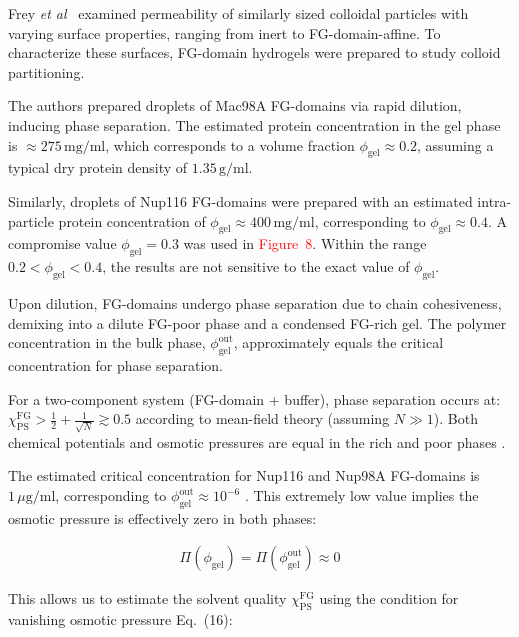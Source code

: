 \documentclass[10pt, a4paper, twocolumn]{article}
\newcommand\todo[1]{\textcolor{red}{#1}}
\begin{document}
Frey \textit{et al}~\cite{Frey2018} examined permeability of similarly sized colloidal particles with varying surface properties, ranging from inert to FG-domain-affine.
To characterize these surfaces, FG-domain hydrogels were prepared to study colloid partitioning.

The authors prepared droplets of Mac98A FG-domains via rapid dilution, inducing phase separation. 
The estimated protein concentration in the gel phase is $\approx 275 \, \text{mg}/\text{ml}$, which corresponds to a volume fraction $\phi_{\text{gel}} \approx 0.2$, assuming a typical dry protein density of $1.35 \, \text{g}/\text{ml}$.

Similarly, droplets of Nup116 FG-domains were prepared with an estimated intra-particle protein concentration of $\phi_{\text{gel}} \approx 400 \, \text{mg}/\text{ml}$, corresponding to $\phi_{\text{gel}} \approx 0.4$. A compromise value $\phi_{\text{gel}} = 0.3$ was used in \todo{Figure~8}.
Within the range $0.2 < \phi_{\text{gel}} < 0.4$, the results are not sensitive to the exact value of $\phi_{\text{gel}}$.

Upon dilution, FG-domains undergo phase separation due to chain cohesiveness, demixing into a dilute FG-poor phase and a condensed FG-rich gel.
The polymer concentration in the bulk phase, $\phi_{\text{gel}}^{\text{out}}$, approximately equals the critical concentration for phase separation.

For a two-component system (FG-domain + buffer), phase separation occurs at:
$
\chi_{\text{PS}}^{\text{FG}} > \frac{1}{2} + \frac{1}{\sqrt{N}} \gtrsim 0.5
$
according to mean-field theory (assuming $N \gg 1$). 
Both chemical potentials and osmotic pressures are equal in the rich and poor phases \cite{Vovk2016, Zilman2018}.

The estimated critical concentration for Nup116 and Nup98A FG-domains is $1 \, \mu\text{g}/\text{ml}$, corresponding to \mbox{$\phi_{\text{gel}}^{\text{out}} \approx 10^{-6}$} \cite{Schmidt2015}.
This extremely low value implies the osmotic pressure is effectively zero in both phases:

\begin{eqnarray}
    \Pi(\phi_{\text{gel}}) = \Pi(\phi_{\text{gel}}^{\text{out}}) \approx 0
\end{eqnarray}

This allows us to estimate the solvent quality $\chi_{\text{PS}}^{\text{FG}}$ using the condition for vanishing osmotic pressure Eq.~(16):
\end{document}
